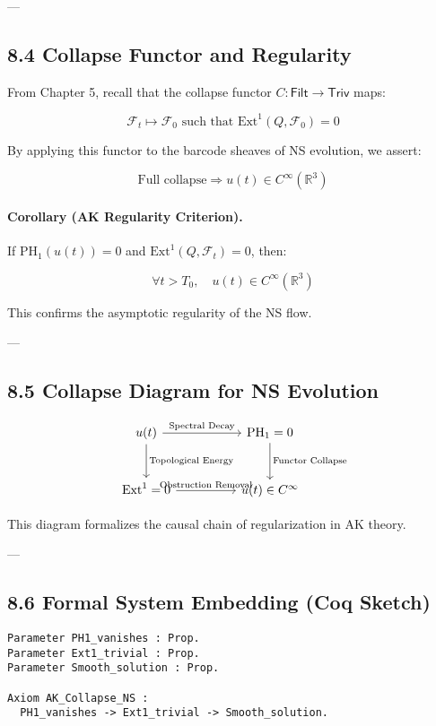 \documentclass[11pt]{article}
\begin{document}
---

\subsection*{8.4 Collapse Functor and Regularity}

From Chapter 5, recall that the collapse functor \( C: \mathsf{Filt} \to \mathsf{Triv} \) maps:

\[
\mathcal{F}_t \mapsto \mathcal{F}_0 \text{ such that } \mathrm{Ext}^1(Q, \mathcal{F}_0) = 0
\]

By applying this functor to the barcode sheaves of NS evolution, we assert:

\[
\text{Full collapse} \Rightarrow u(t) \in C^\infty(\mathbb{R}^3)
\]

\paragraph{Corollary (AK Regularity Criterion).}
If \( \mathrm{PH}_1(u(t)) = 0 \) and \( \mathrm{Ext}^1(Q, \mathcal{F}_t) = 0 \), then:

\[
\forall t > T_0,\quad u(t) \in C^\infty(\mathbb{R}^3)
\]

This confirms the asymptotic regularity of the NS flow.

---

\subsection*{8.5 Collapse Diagram for NS Evolution}

\[
\begin{tikzcd}[row sep=large, column sep=huge]
u(t) \arrow[r, "\text{Spectral Decay}"] \arrow[d, "\text{Topological Energy}"]
& \mathrm{PH}_1 = 0 \arrow[d, "\text{Functor Collapse}"] \\
\mathrm{Ext}^1 = 0 \arrow[r, "\text{Obstruction Removal}"]
& u(t) \in C^\infty
\end{tikzcd}
\]

This diagram formalizes the causal chain of regularization in AK theory.

---

\subsection*{8.6 Formal System Embedding (Coq Sketch)}

\begin{lstlisting}[language=Coq]
Parameter PH1_vanishes : Prop.
Parameter Ext1_trivial : Prop.
Parameter Smooth_solution : Prop.

Axiom AK_Collapse_NS :
  PH1_vanishes -> Ext1_trivial -> Smooth_solution.
\end{lstlisting}
\end{document}
